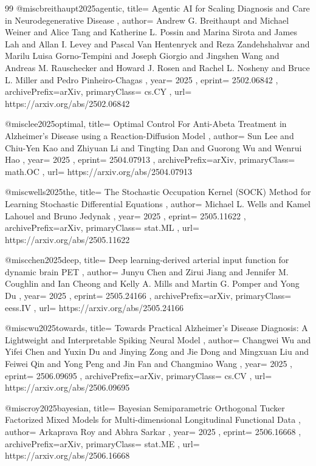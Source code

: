 \documentclass[11pt,a4paper]{article}
\begin{document}
\begin{thebibliography}{99}
@misc{breithaupt2025agentic,
  title={ Agentic AI for Scaling Diagnosis and Care in Neurodegenerative Disease },
  author={ Andrew G. Breithaupt and Michael Weiner and Alice Tang and Katherine L. Possin and Marina Sirota and James Lah and Allan I. Levey and Pascal Van Hentenryck and Reza Zandehshahvar and Marilu Luisa Gorno-Tempini and Joseph Giorgio and Jingshen Wang and Andreas M. Rauschecker and Howard J. Rosen and Rachel L. Nosheny and Bruce L. Miller and Pedro Pinheiro-Chagas },
  year={ 2025 },
  eprint={ 2502.06842 },
  archivePrefix={arXiv},
  primaryClass={ cs.CY },
  url={ https://arxiv.org/abs/2502.06842 }
}


@misc{lee2025optimal,
  title={ Optimal Control For Anti-Abeta Treatment in Alzheimer's Disease using a Reaction-Diffusion Model },
  author={ Sun Lee and Chiu-Yen Kao and Zhiyuan Li and Tingting Dan and Guorong Wu and Wenrui Hao },
  year={ 2025 },
  eprint={ 2504.07913 },
  archivePrefix={arXiv},
  primaryClass={ math.OC },
  url={ https://arxiv.org/abs/2504.07913 }
}


@misc{wells2025the,
  title={ The Stochastic Occupation Kernel (SOCK) Method for Learning Stochastic Differential Equations },
  author={ Michael L. Wells and Kamel Lahouel and Bruno Jedynak },
  year={ 2025 },
  eprint={ 2505.11622 },
  archivePrefix={arXiv},
  primaryClass={ stat.ML },
  url={ https://arxiv.org/abs/2505.11622 }
}


@misc{chen2025deep,
  title={ Deep learning-derived arterial input function for dynamic brain PET },
  author={ Junyu Chen and Zirui Jiang and Jennifer M. Coughlin and Ian Cheong and Kelly A. Mills and Martin G. Pomper and Yong Du },
  year={ 2025 },
  eprint={ 2505.24166 },
  archivePrefix={arXiv},
  primaryClass={ eess.IV },
  url={ https://arxiv.org/abs/2505.24166 }
}


@misc{wu2025towards,
  title={ Towards Practical Alzheimer's Disease Diagnosis: A Lightweight and Interpretable Spiking Neural Model },
  author={ Changwei Wu and Yifei Chen and Yuxin Du and Jinying Zong and Jie Dong and Mingxuan Liu and Feiwei Qin and Yong Peng and Jin Fan and Changmiao Wang },
  year={ 2025 },
  eprint={ 2506.09695 },
  archivePrefix={arXiv},
  primaryClass={ cs.CV },
  url={ https://arxiv.org/abs/2506.09695 }
}


@misc{roy2025bayesian,
  title={ Bayesian Semiparametric Orthogonal Tucker Factorized Mixed Models for Multi-dimensional Longitudinal Functional Data },
  author={ Arkaprava Roy and Abhra Sarkar },
  year={ 2025 },
  eprint={ 2506.16668 },
  archivePrefix={arXiv},
  primaryClass={ stat.ME },
  url={ https://arxiv.org/abs/2506.16668 }
}



\end{thebibliography}
\end{document}
